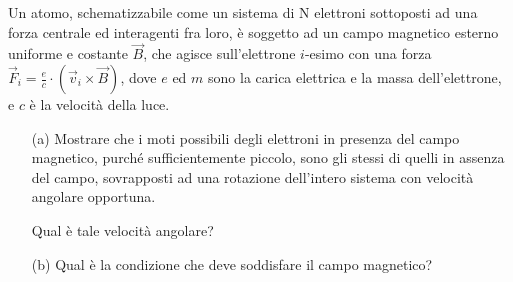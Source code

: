 \documentclass[../main.tex]{subfiles}
\begin{document}
  \textex
  Un atomo, schematizzabile come un sistema di N elettroni sottoposti ad una forza centrale ed interagenti fra loro, \`e soggetto ad un campo magnetico esterno uniforme e costante $\vec B$, che agisce sull'elettrone $i$-esimo con una forza $\vec F_i = \frac{e}{c} \cdot \left(\vec v_i \times \vec B\right)$, dove $e$ ed $m$ sono la carica elettrica e la massa dell'elettrone, e $c$ \`e la velocit\`a della luce.

  \begin{itemize}
    \item[(a)] Mostrare che i moti possibili degli elettroni in presenza del campo magnetico, purch\'e sufficientemente piccolo, sono gli stessi di quelli in assenza del campo, sovrapposti ad una rotazione dell'intero sistema con velocit\`a angolare opportuna.
    
    Qual \`e tale velocit\`a angolare?
    \item[(b)]Qual \`e la condizione che deve soddisfare il campo magnetico?
  \end{itemize}
\end{document}

